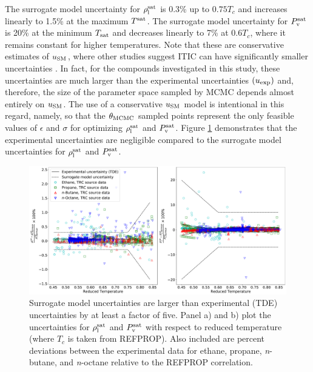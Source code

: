 \documentclass[journal=jctc,manuscript=article]{achemso}
\begin{document}
The surrogate model uncertainty for $\rho_{\rm l}^{\rm sat}$ is 0.3\% up to $0.75 T_c$ and increases linearly to 1.5\% at the maximum $T^{\rm sat}$. The surrogate model uncertainty for $P_{\rm v}^{\rm sat}$ is 20\% at the minimum $T_{\rm sat}$ and decreases linearly to 7\% at $0.6 T_c$, where it remains constant for higher temperatures. Note that these are conservative estimates of $u_{\rm SM}$, where other studies suggest ITIC can have significantly smaller uncertainties \cite{Mostafa_Diss}. In fact, for the compounds investigated in this study, these uncertainties are much larger than the experimental uncertainties $(u_{\rm exp})$ and, therefore, the size of the parameter space sampled by MCMC depends almost entirely on $u_{\rm SM}$. The use of a conservative $u_{\rm SM}$ model is intentional in this regard, namely, so that the $\theta_{\rm MCMC}$ sampled points represent the only feasible values of $\epsilon$ and $\sigma$ for optimizing $\rho_{\rm l}^{\rm sat}$ and $P_{\rm v}^{\rm sat}$. Figure \ref{fig:Error_model} demonstrates that the experimental uncertainties are negligible compared to the surrogate model uncertainties for $\rho_{\rm l}^{\rm sat}$ and $P_{\rm v}^{\rm sat}$.

\begin{figure}[htb!]
	\centering
	\includegraphics[width=6.4in]{Error_model_alkanes}
	\caption{Surrogate model uncertainties are larger than experimental (TDE) uncertainties by at least a factor of five. Panel a) and b) plot the uncertainties for $\rho_{\rm l}^{\rm sat}$ and $P_{\rm v}^{\rm sat}$ with respect to reduced temperature (where $T_c$ is taken from REFPROP). Also included are percent deviations between the experimental data for ethane, propane, \textit{n}-butane, and \textit{n}-octane relative to the REFPROP correlation.}
	\label{fig:Error_model}
\end{figure} 
\end{document}
